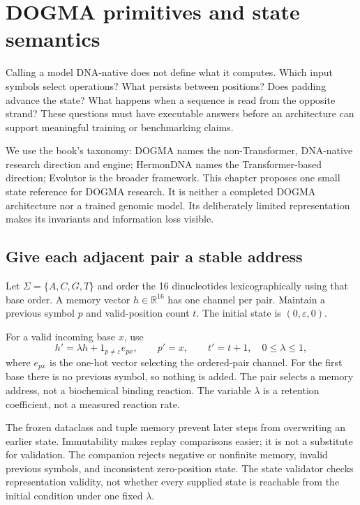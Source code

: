 \chapter{DOGMA primitives and state semantics}
Calling a model DNA-native does not define what it computes. Which input
symbols select operations? What persists between positions? Does padding
advance the state? What happens when a sequence is read from the opposite
strand? These questions must have executable answers before an architecture
can support meaningful training or benchmarking claims.

We use the book's taxonomy: DOGMA names the non-Transformer, DNA-native
research direction and engine; HermonDNA names the Transformer-based direction;
Evolutor is the broader framework. This chapter proposes one small state
reference for DOGMA research. It is neither a completed DOGMA architecture
nor a trained genomic model. Its deliberately limited representation makes
its invariants and information loss visible.

\section{Give each adjacent pair a stable address}
Let $\Sigma=\{A,C,G,T\}$ and order the 16 dinucleotides lexicographically
using that base order. A memory vector $h\in\mathbb R^{16}$ has one channel
per pair. Maintain a previous symbol $p$ and valid-position count $t$.
The initial state is $(0,\varepsilon,0)$.

For a valid incoming base $x$, use
\begin{equation}
 h'=\lambda h+1_{p\ne\varepsilon}e_{px},\qquad
 p'=x,\qquad t'=t+1,\quad 0\leq\lambda\leq1,
 \label{eq:transition}
\end{equation}
where $e_{px}$ is the one-hot vector selecting the ordered-pair channel.
For the first base there is no previous symbol, so nothing is added.
The pair selects a memory address, not a biochemical binding reaction.
The variable $\lambda$ is a retention coefficient, not a measured reaction rate.


The frozen dataclass and tuple memory prevent later steps from overwriting
an earlier state. Immutability makes replay comparisons easier; it is not
a substitute for validation. The companion rejects negative or nonfinite
memory, invalid previous symbols, and inconsistent zero-position state.
The state validator checks representation validity, not whether every supplied
state is reachable from the initial condition under one fixed $\lambda$.

